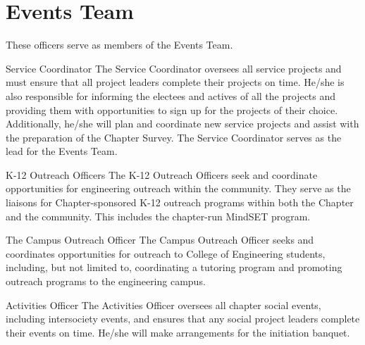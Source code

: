 \section{Events Team}
These officers serve as members of the Events Team.
\begin{enumsubsection}
\item{Service Coordinator} The Service Coordinator oversees all service projects and must ensure that all project leaders complete their projects on time. He/she is also responsible for informing the electees and actives of all the projects and providing them with opportunities to sign up for the projects of their choice. Additionally, he/she will plan and coordinate new service projects and assist with the preparation of the Chapter Survey. The Service Coordinator serves as the lead for the Events Team.
\item{ K-12 Outreach Officers} The K-12 Outreach Officers seek and coordinate opportunities for engineering outreach within the community.  They serve as the liaisons for Chapter-sponsored K-12 outreach programs within both the Chapter and the community. This includes the chapter-run MindSET program. 

\item{The Campus Outreach Officer} The Campus Outreach Officer seeks and coordinates opportunities for outreach to College of Engineering students, including, but not limited to, coordinating a tutoring program and promoting outreach programs to the engineering campus. 

\item{Activities Officer} The Activities Officer oversees all chapter social events, including intersociety events, and ensures that any social project leaders complete their events on time. He/she will make arrangements for the initiation banquet. 
\end{enumsubsection}
